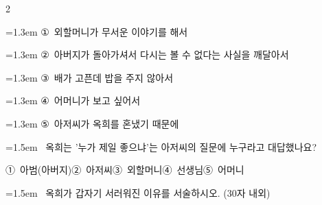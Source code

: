 \documentclass[11pt, a4paper]{article}
\begin{document}
\begin{multicols}{2}
\begin{minipage}{\columnwidth}
\vspace{0.5mm}
{\hangindent=1.3em  \noindent\hspace{0.3em}①~외할머니가 무서운 이야기를 해서\par}
{\hangindent=1.3em  \noindent\hspace{0.3em}②~아버지가 돌아가셔서 다시는 볼 수 없다는 사실을 깨달아서\par}
{\hangindent=1.3em  \noindent\hspace{0.3em}③~배가 고픈데 밥을 주지 않아서\par}
{\hangindent=1.3em  \noindent\hspace{0.3em}④~어머니가 보고 싶어서\par}
{\hangindent=1.3em  \noindent\hspace{0.3em}⑤~아저씨가 옥희를 혼냈기 때문에\par}
\vspace{4mm}
\end{minipage}
\par

\noindent\begin{minipage}{\columnwidth}
\vspace{2mm}
{\hangindent=1.5em  ~옥희는 '누가 제일 좋으냐'는 아저씨의 질문에 누구라고 대답했나요?\par}

\vspace{0.5mm}
\noindent
\mbox{①~아범(아버지)}\hspace{1em}\mbox{②~아저씨}\hspace{1em}\mbox{③~외할머니}\hspace{1em}\mbox{④~선생님}\hspace{1em}\mbox{⑤~어머니}

\vspace{4mm}
\end{minipage}
\par

\noindent\begin{minipage}{\columnwidth}
\vspace{2mm}
{\hangindent=1.5em  ~옥희가 갑자기 서러워진 이유를 서술하시오. (30자 내외)\par}

\vspace{3mm}
\noindent\hrulefill
\vspace{2.5mm}
\noindent\hrulefill
\vspace{2.5mm}
\noindent\hrulefill
\vspace{2.5mm}
\noindent\hrulefill
\vspace{2.5mm}
\noindent\hrulefill
\vspace{2.5mm}
\vspace{1mm}
\vspace{4mm}
\end{minipage}
\par


\end{multicols}
\end{document}
